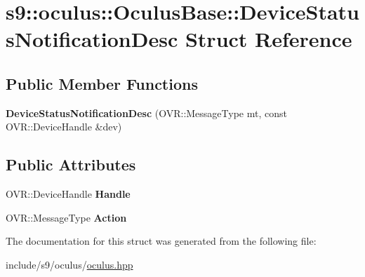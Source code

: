 \hypertarget{structs9_1_1oculus_1_1OculusBase_1_1DeviceStatusNotificationDesc}{\section{s9\-:\-:oculus\-:\-:\-Oculus\-Base\-:\-:\-Device\-Status\-Notification\-Desc \-Struct \-Reference}
\label{structs9_1_1oculus_1_1OculusBase_1_1DeviceStatusNotificationDesc}
}
\subsection*{\-Public \-Member \-Functions}
\begin{DoxyCompactItemize}
\item 
\hypertarget{structs9_1_1oculus_1_1OculusBase_1_1DeviceStatusNotificationDesc_ab9ba774f4572708770ad28dfafeb84dc}{{\bfseries \-Device\-Status\-Notification\-Desc} (\-O\-V\-R\-::\-Message\-Type mt, const \-O\-V\-R\-::\-Device\-Handle \&dev)}\label{structs9_1_1oculus_1_1OculusBase_1_1DeviceStatusNotificationDesc_ab9ba774f4572708770ad28dfafeb84dc}

\end{DoxyCompactItemize}
\subsection*{\-Public \-Attributes}
\begin{DoxyCompactItemize}
\item 
\hypertarget{structs9_1_1oculus_1_1OculusBase_1_1DeviceStatusNotificationDesc_a64c6d955e46160eb5e0b31e5cd769b22}{\-O\-V\-R\-::\-Device\-Handle {\bfseries \-Handle}}\label{structs9_1_1oculus_1_1OculusBase_1_1DeviceStatusNotificationDesc_a64c6d955e46160eb5e0b31e5cd769b22}

\item 
\hypertarget{structs9_1_1oculus_1_1OculusBase_1_1DeviceStatusNotificationDesc_a2a4e88e7c6ff451ee9cb6f6212509923}{\-O\-V\-R\-::\-Message\-Type {\bfseries \-Action}}\label{structs9_1_1oculus_1_1OculusBase_1_1DeviceStatusNotificationDesc_a2a4e88e7c6ff451ee9cb6f6212509923}

\end{DoxyCompactItemize}


\-The documentation for this struct was generated from the following file\-:\begin{DoxyCompactItemize}
\item 
include/s9/oculus/\hyperlink{oculus_8hpp}{oculus.\-hpp}\end{DoxyCompactItemize}
